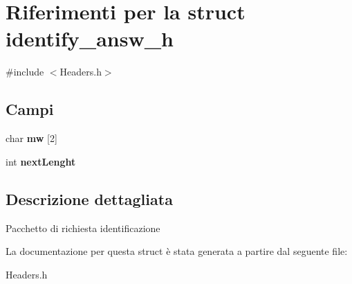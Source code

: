 \hypertarget{structidentify__answ__h}{}\section{Riferimenti per la struct identify\+\_\+answ\+\_\+h}
\label{structidentify__answ__h}


{\ttfamily \#include $<$Headers.\+h$>$}

\subsection*{Campi}
\begin{DoxyCompactItemize}
\item 
char {\bfseries mw} \mbox{[}2\mbox{]}\hypertarget{structidentify__answ__h_afae2b93794a47b9581d77cc98e919314}{}\label{structidentify__answ__h_afae2b93794a47b9581d77cc98e919314}

\item 
int {\bfseries next\+Lenght}\hypertarget{structidentify__answ__h_ae7b384fb55a83e8013985d97c3d44a9a}{}\label{structidentify__answ__h_ae7b384fb55a83e8013985d97c3d44a9a}

\end{DoxyCompactItemize}


\subsection{Descrizione dettagliata}
Pacchetto di richiesta identificazione 

La documentazione per questa struct è stata generata a partire dal seguente file\+:\begin{DoxyCompactItemize}
\item 
Headers.\+h\end{DoxyCompactItemize}
